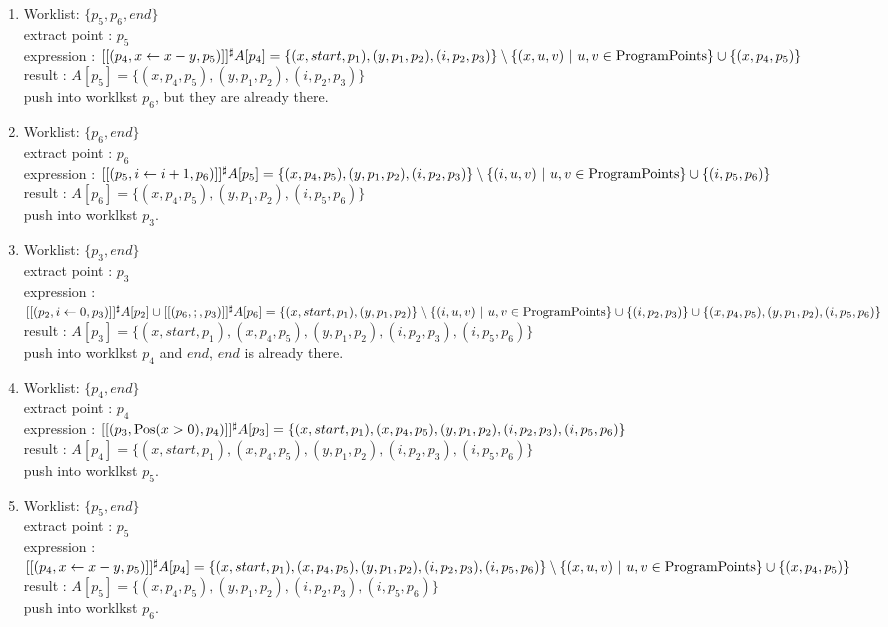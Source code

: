 \documentclass[a4paper]{article}
\begin{document}
\begin{enumerate}
  \item Worklist: $ \{ p_5, p_6, end \} $ \\
  extract point : $ p_5 $ \\
  expression : $ [[(p_4, x \leftarrow x - y, p_5)]]^\sharp A[p_4] = \{ (x, start, p_1), (y, p_1, p_2), (i, p_2, p_3) \} \setminus \{ (x, u, v)\ |\ u, v \in \mathrm{ProgramPoints} \} \cup \{ (x, p_4, p_5) \} $ \\
  result : $ A[p_5] = \{ (x, p_4, p_5), (y, p_1, p_2), (i, p_2, p_3) \} $ \\
  push into worklkst $ p_6 $, but they are already there.

  \item Worklist: $ \{ p_6, end \} $ \\
  extract point : $ p_6 $ \\
  expression : $ [[(p_5, i \leftarrow i + 1, p_6)]]^\sharp A[p_5] = \{ (x, p_4, p_5), (y, p_1, p_2), (i, p_2, p_3) \} \setminus \{ (i, u, v)\ |\ u, v \in \mathrm{ProgramPoints} \} \cup \{ (i, p_5, p_6) \} $ \\
  result : $ A[p_6] = \{ (x, p_4, p_5), (y, p_1, p_2), (i, p_5, p_6) \} $ \\
  push into worklkst $ p_3 $.


  \item Worklist: $ \{ p_3, end \} $ \\
  extract point : $ p_3 $ \\
  expression : $ [[(p_2, i \leftarrow 0, p_3)]]^\sharp A[p_2] \cup [[(p_6, ;, p_3)]]^\sharp A[p_6] = \{ (x, start, p_1), (y, p_1, p_2) \} \setminus \{ (i, u, v)\ |\ u, v \in \mathrm{ProgramPoints} \} \cup \{ (i, p_2, p_3) \} \cup \{ (x, p_4, p_5), (y, p_1, p_2), (i, p_5, p_6)  \} $ \\
  result : $ A[p_3] = \{ (x, start, p_1), (x, p_4, p_5), (y, p_1, p_2), (i, p_2, p_3), (i, p_5, p_6) \} $ \\
  push into worklkst $ p_4 $ and $ end $, $ end $ is already there.

  \item Worklist: $ \{ p_4, end \} $ \\
  extract point : $ p_4 $ \\
  expression : $ [[(p_3, \mathrm{Pos}(x > 0), p_4)]]^\sharp A[p_3] = \{ (x, start, p_1), (x, p_4, p_5), (y, p_1, p_2), (i, p_2, p_3), (i, p_5, p_6) \} $ \\
  result : $ A[p_4] = \{ (x, start, p_1), (x, p_4, p_5), (y, p_1, p_2), (i, p_2, p_3), (i, p_5, p_6) \} $ \\
  push into worklkst $ p_5 $.

  \item Worklist: $ \{ p_5, end \} $ \\
  extract point : $ p_5 $ \\
  expression : $ [[(p_4, x \leftarrow x - y, p_5)]]^\sharp A[p_4] = \{ (x, start, p_1), (x, p_4, p_5), (y, p_1, p_2), (i, p_2, p_3), (i, p_5, p_6) \} \setminus \{ (x, u, v)\ |\ u, v \in \mathrm{ProgramPoints} \} \cup \{ (x, p_4, p_5) \} $ \\
  result : $ A[p_5] = \{ (x, p_4, p_5), (y, p_1, p_2), (i, p_2, p_3), (i, p_5, p_6) \} $ \\
  push into worklkst $ p_6 $.


\end{enumerate}
\end{document}
